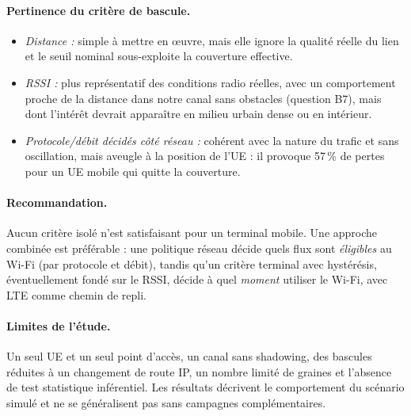 \paragraph{Pertinence du critère de bascule.}
\begin{itemize}
  \item \emph{Distance :} simple à mettre en \oe uvre, mais elle ignore la
        qualité réelle du lien et le seuil nominal sous-exploite la couverture
        effective.
  \item \emph{RSSI :} plus représentatif des conditions radio réelles, avec un
        comportement proche de la distance dans notre canal sans obstacles
        (question B7), mais dont l'intérêt devrait apparaître en milieu urbain
        dense ou en intérieur.
  \item \emph{Protocole/débit décidés côté réseau :} cohérent avec la nature du
        trafic et sans oscillation, mais aveugle à la position de l'UE : il
        provoque 57\,\% de pertes pour un UE mobile qui quitte la couverture.
\end{itemize}

\paragraph{Recommandation.}
Aucun critère isolé n'est satisfaisant pour un terminal mobile. Une approche
combinée est préférable : une politique réseau décide quels flux sont
\emph{éligibles} au Wi-Fi (par protocole et débit), tandis qu'un critère
terminal avec hystérésis, éventuellement fondé sur le RSSI, décide à quel
\emph{moment} utiliser le Wi-Fi, avec LTE comme chemin de repli.

\paragraph{Limites de l'étude.}
Un seul UE et un seul point d'accès, un canal sans shadowing, des bascules
réduites à un changement de route IP, un nombre limité de graines et
l'absence de test statistique inférentiel. Les résultats décrivent le
comportement du scénario simulé et ne se généralisent pas sans campagnes
complémentaires.
